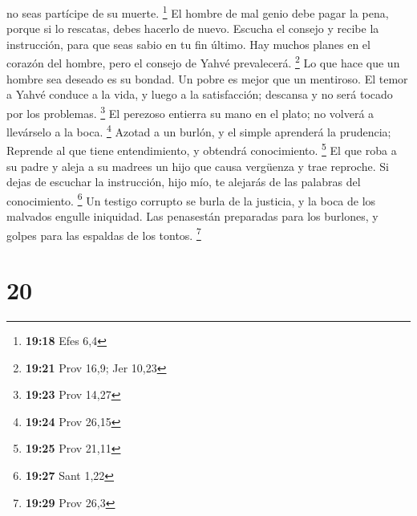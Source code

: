 no seas partícipe de su muerte. \footnote{\textbf{19:18} Efes 6,4}
 El hombre de mal genio debe pagar la pena, porque si lo
rescatas, debes hacerlo de nuevo.  Escucha el consejo y
recibe la instrucción, para que seas sabio en tu fin último.
 Hay muchos planes en el corazón del hombre, pero el
consejo de Yahvé prevalecerá. \footnote{\textbf{19:21} Prov 16,9; Jer
  10,23}  Lo que hace que un hombre sea deseado es su
bondad. Un pobre es mejor que un mentiroso.  El temor a
Yahvé conduce a la vida, y luego a la satisfacción; descansa y no será
tocado por los problemas. \footnote{\textbf{19:23} Prov 14,27}
 El perezoso entierra su mano en el plato; no volverá a
llevárselo a la boca. \footnote{\textbf{19:24} Prov 26,15}
 Azotad a un burlón, y el simple aprenderá la prudencia;
Reprende al que tiene entendimiento, y obtendrá conocimiento.
\footnote{\textbf{19:25} Prov 21,11}  El que roba a su
padre y aleja a su madrees un hijo que causa vergüenza y trae reproche.
 Si dejas de escuchar la instrucción, hijo mío, te
alejarás de las palabras del conocimiento. \footnote{\textbf{19:27} Sant
  1,22}  Un testigo corrupto se burla de la justicia, y
la boca de los malvados engulle iniquidad.  Las
penasestán preparadas para los burlones, y golpes para las espaldas de
los tontos. \footnote{\textbf{19:29} Prov 26,3}

\hypertarget{section-19}{%
\section{20}\label{section-19}}

